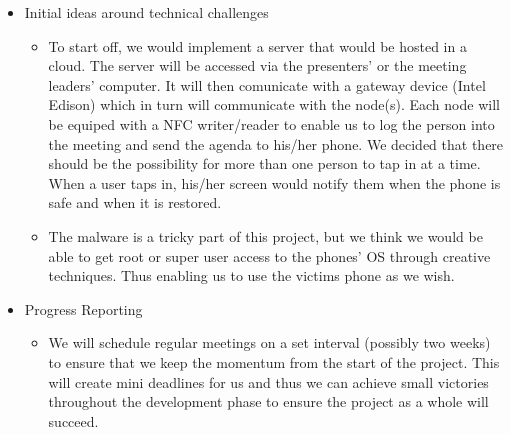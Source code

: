 
\begin{itemize}
	\item Initial ideas around technical challenges
	\begin{itemize}
		\item[] To start off, we would implement a server that would be hosted in a cloud. The server will be accessed via the presenters' or the meeting leaders' computer. It will then comunicate with a gateway device (Intel Edison) which in turn will communicate with the node(s). Each node will be equiped with a NFC writer/reader to enable us to log the person into the meeting and send the agenda to his/her phone. We decided that there should be the possibility for more than one person to tap in at a time. When a user taps in, his/her screen would notify them when the phone is safe and when it is restored.
		\item[] The malware is a tricky part of this project, but we think we would be able to get root or super user access to the phones' OS through creative techniques. Thus enabling us to use the victims phone as we wish.
	\end{itemize}
	
	\item Progress Reporting
	\begin{itemize}
		\item[] We will schedule regular meetings on a set interval (possibly two weeks) to ensure that we keep the momentum from the start of the project. This will create mini deadlines for us and thus we can achieve small victories throughout the development phase to ensure the project as a whole will succeed.
	\end{itemize}
	

\end{itemize}
